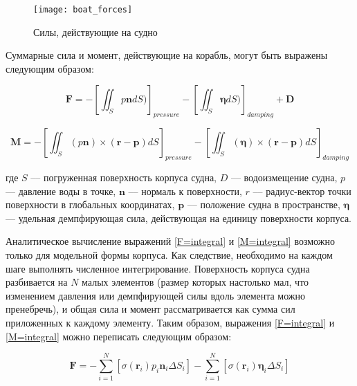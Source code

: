 \begin{figure}[ht]
\begin{center}
\texttt{[image: boat\_forces]}
\end{center}
\caption{Силы, действующие на судно}
\label{boat_forces}
\end{figure}

Суммарные сила и момент, действующие на корабль, могут быть выражены следующим образом:

\begin{equation}
	\mathbf{F} = 
		-\left[ \iint_{S} p \mathbf{n} dS ) 		\right]_{pressure}
		-\left[ \iint_{S} \boldsymbol{\eta} dS ) 	\right]_{damping}
		+ \mathbf{D}
	\label{F=integral}
\end{equation}

\begin{equation}
	\mathbf{M} = 
	-\left[ \iint_{S} 
		\left( p \mathbf{n} \right) \times 
		\left( \mathbf{r} - \mathbf{p} \right) dS	
	\right]_{pressure}
	-\left[ \iint_{S} 
		\left( \boldsymbol{\eta} \right) \times 
		\left( \mathbf{r} - \mathbf{p} \right) dS	
	\right]_{damping}
	\label{M=integral}
\end{equation}

где $S$ --– погруженная поверхность корпуса судна, $D$ --– водоизмещение судна, $p$ –-- давление воды в точке, $\mathbf{n}$ –-- нормаль к поверхности, $r$ --– радиус-вектор точки поверхности в глобальных координатах, $\mathbf{p}$ –-- положение судна в пространстве, $\boldsymbol{\eta}$ --- удельная демпфирующая сила, действующая на единицу поверхности корпуса.

Аналитическое вычисление выражений \eqref{F=integral} и \eqref{M=integral} возможно только для модельной формы корпуса. Как следствие, необходимо на каждом шаге выполнять численное интегрирование. Поверхность корпуса судна разбивается на $N$ малых элементов (размер которых настолько мал, что изменением давления или демпфирующей силы вдоль элемента можно пренебречь), и общая сила и момент рассматривается как сумма сил приложенных к каждому элементу. Таким образом, выражения \eqref{F=integral} и \eqref{M=integral} можно переписать следующим образом:

\begin{equation}
	\mathbf{F} = 
		-\sum_{i=1}^{N} \left[
			\sigma (\mathbf{r}_i) p_i \mathbf{n}_i \Delta S_i
		\right]
		-\sum_{i=1}^{N} \left[
			\sigma (\mathbf{r}_i) \boldsymbol{\eta}_i \Delta S_i
		\right]
\end{equation}

